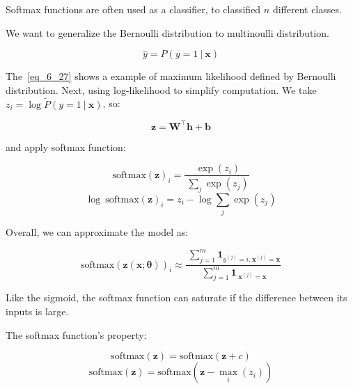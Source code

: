   Softmax functions are often used as a classifier, to classified $n$ different classes.

  We want to generalize the Bernoulli distribution to multinoulli distribution.

  \begin{equation} \tag{6.27}
    \label{eq_6_27}
    \hat{y} = P( y=1\ |\ \bm{x} )
  \end{equation}

  The~\eqref{eq_6_27} shows a example of maximum likelihood defined by Bernoulli distribution.
  Next, using log-likelihood to simplify computation. We take $z _ i = \log \tilde{P}( y=1\ |\ \bm{x} )$, so:

  \begin{equation} \tag{6.28}
    \label{eq_6_28}
    \bm{z} = \bm{W} ^ \top \bm{h} + \bm{b}
  \end{equation}

  and apply softmax function:

  \begin{equation} \tag{6.29}
    \label{eq_6_29}
    \mathrm{softmax}{( \bm{z} )} _ i = \frac{\ \exp(z_i) } {\ \sum _ j \exp(z_j) }
  \end{equation}
  \begin{equation} \tag{6.30}
    \label{eq_6_30}
    \log\ \mathrm{softmax}{( \bm{z} )} _ i = z_i - \log \sum _ j \exp(z_j)
  \end{equation}

  Overall, we can approximate the model as:

  \begin{equation} \tag{6.31}
    \label{eq_6_31}
    \mathrm{softmax}{( \bm{z}( \bm{x};\bm{\theta} ) )} _ i \approx
      \frac{\ \sum ^ m _ {j=1} \bm{1} _ {y ^ {(j)} = i, \bm{x} ^ {(j)} = \bm{x}} }
        {\ \sum ^ m _ {j=1} \bm{1} _ {\ \bm{x} ^ {(j)} = \bm{x}} }
  \end{equation}

  Like the sigmoid, the softmax function can saturate if the difference between its inputs is large.

  The softmax function's property:

  \begin{equation} \tag{6.32}
    \label{eq_6_32}
    \mathrm{softmax}( \bm{z} ) = \mathrm{softmax}( \bm{z} + c )
  \end{equation}
  \begin{equation} \tag{6.33}
    \label{eq_6_33}
    \mathrm{softmax}( \bm{z} ) = \mathrm{softmax}( \bm{z} - \max _ i (z _ i) )
  \end{equation}

